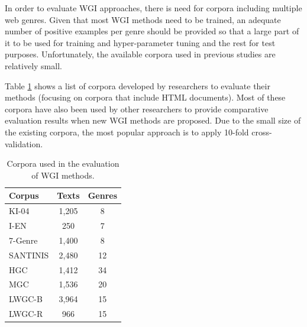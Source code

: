In order to evaluate WGI approaches, there is need for corpora including multiple web genres. Given that most WGI methods need to be trained, an adequate number of positive examples per genre should be provided so that a large part of it to be used for training and hyper-parameter tuning and the rest for test purposes. Unfortunately, the available corpora used in previous studies are relatively small. 

Table \ref{table:corpora} shows a list of corpora developed by researchers to evaluate their methods (focusing on corpora that include HTML documents). Most of these corpora have also been used by other researchers to provide comparative evaluation results when new WGI methods are proposed. Due to the small size of the existing corpora, the most popular approach is to apply 10-fold cross-validation.

\begin{table}[t]
	\center
	\caption {Corpora used in the evaluation of WGI methods.}\label{table:corpora}
	\begin{tabular}{lcc}
		\hline
		Corpus & Texts & Genres \\
		\hline
        KI-04 & 1,205 & 8 \\
        I-EN & 250 & 7 \\
        7-Genre & 1,400 & 8 \\
        SANTINIS & 2,480 & 12 \\
        HGC & 1,412 & 34 \\
        MGC & 1,536 & 20 \\
        LWGC-B & 3,964 & 15 \\
        LWGC-R & 966 & 15 \\
  		\hline
	\end{tabular}
\end{table}

